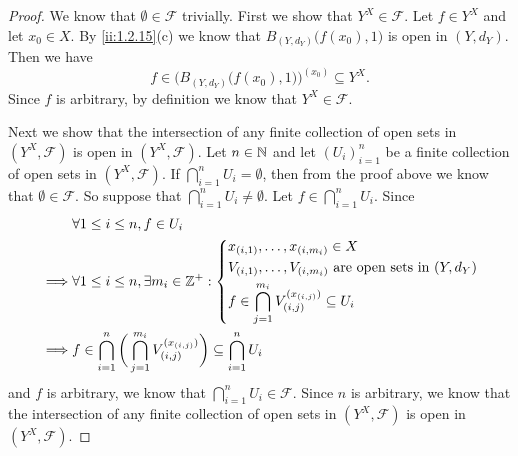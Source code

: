\begin{proof}
  We know that \(\emptyset \in \mathcal{F}\) trivially.
  First we show that \(Y^X \in \mathcal{F}\).
  Let \(f \in Y^X\) and let \(x_0 \in X\).
  By \cref{ii:1.2.15}(c) we know that \(B_{(Y, d_Y)}\big(f(x_0), 1\big)\) is open in \((Y, d_Y)\).
  Then we have
  \[
    f \in \Big(B_{(Y, d_Y)}\big(f(x_0), 1\big)\Big)^{(x_0)} \subseteq Y^X.
  \]
  Since \(f\) is arbitrary, by definition we know that \(Y^X \in \mathcal{F}\).

  Next we show that the intersection of any finite collection of open sets in \((Y^X, \mathcal{F})\) is open in \((Y^X, \mathcal{F})\).
  Let \(n \in \mathbb{N}\) and let \((U_i)_{i = 1}^n\) be a finite collection of open sets in \((Y^X, \mathcal{F})\).
  If \(\bigcap_{i = 1}^n U_i = \emptyset\), then from the proof above we know that \(\emptyset \in \mathcal{F}\).
  So suppose that \(\bigcap_{i = 1}^n U_i \neq \emptyset\).
  Let \(f \in \bigcap_{i = 1}^n U_i\).
  Since
  \begin{align*}
             & \forall 1 \leq i \leq n, f \in U_i                                                                                  \\
    \implies & \forall 1 \leq i \leq n, \exists m_i \in \mathbb{Z}^+ : \begin{dcases}
                                                                 x_{(i, 1)}, \dots, x_{(i, m_i)} \in X                              \\
                                                                 V_{(i, 1)}, \dots, V_{(i, m_i)} \text{ are open sets in } (Y, d_Y) \\
                                                                 f \in \bigcap_{j = 1}^{m_i} V_{(i, j)}^{(x_{(i, j)})} \subseteq U_i
                                                               \end{dcases}  \\
    \implies & f \in \bigcap_{i = 1}^n \bigg(\bigcap_{j = 1}^{m_i} V_{(i, j)}^{(x_{(i, j)})}\bigg) \subseteq \bigcap_{i = 1}^n U_i
  \end{align*}
  and \(f\) is arbitrary, we know that \(\bigcap_{i = 1}^n U_i \in \mathcal{F}\).
  Since \(n\) is arbitrary, we know that the intersection of any finite collection of open sets in \((Y^X, \mathcal{F})\) is open in \((Y^X, \mathcal{F})\).


\end{proof}
